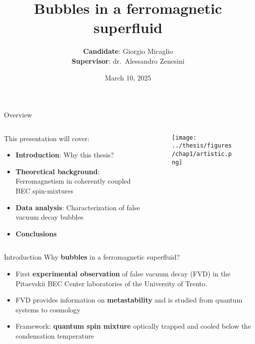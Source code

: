 \documentclass[aspectratio=169]{beamer}
\title[Bubbles in a ferromagnetic superfluid] %
{Bubbles in a ferromagnetic superfluid} %
\author{\textbf{Candidate}: Giorgio Micaglio\\\textbf{Supervisor}: dr.\ Alessandro Zenesini}
\institute{Bachelor's Degree in Physics}
\date[March 10, 2025]  %
{March 10, 2025} %
\begin{document}
\begin{frame}[plain]
  \titlepage
\end{frame}

\begin{frame}{Overview}
  \begin{columns}
      \begin{column}{0.6\textwidth}
          This presentation will cover:
          \begin{itemize}
              \item \textbf{Introduction}: Why this thesis?
              \item \textbf{Theoretical background}: Ferromagnetism in coherently coupled BEC spin-mixtures
              \item \textbf{Data analysis}: Characterization of false vacuum decay bubbles
              \item \textbf{Conclusions}
          \end{itemize}
      \end{column}
      \begin{column}{0.4\textwidth}
          \begin{figure}
              \centering
              \texttt{[image: ../thesis/figures/chap1/artistic.png]}
          \end{figure}
      \end{column}
  \end{columns}
\end{frame}

\begin{frame}{Introduction}
  Why \textbf{bubbles} in a ferromagnetic superfluid?

  \begin{itemize}
      \item First \textbf{experimental observation} of false vacuum decay (FVD) in the Pitaevskii BEC Center laboratories of the University of Trento.
      \item FVD provides information on \textbf{metastability} and is studied from quantum systems to cosmology
      \item Framework: \textbf{quantum spin mixture} optically trapped and cooled below the condensation temperature
  \end{itemize}
  
\end{frame}

\end{document}
